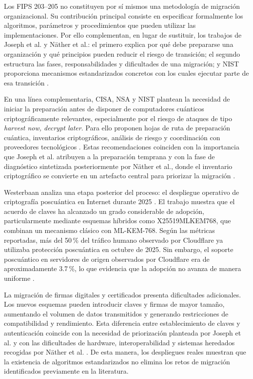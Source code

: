 Los FIPS 203--205 no constituyen por sí mismos una metodología de migración organizacional. Su contribución principal consiste en especificar formalmente los algoritmos, parámetros y procedimientos que pueden utilizar las implementaciones. Por ello complementan, en lugar de sustituir, los trabajos de Joseph et al. y Näther et al.: el primero explica por qué debe prepararse una organización y qué principios pueden reducir el riesgo de transición; el segundo estructura las fases, responsabilidades y dificultades de una migración; y NIST proporciona mecanismos estandarizados concretos con los cuales ejecutar parte de esa transición \cite{joseph2022transitioning,naether2024migrating,nist2024fips203,nist2024fips204,nist2024fips205}.

En una línea complementaria, CISA, NSA y NIST plantean la necesidad de iniciar la preparación antes de disponer de computadores cuánticos criptográficamente relevantes, especialmente por el riesgo de ataques de tipo \textit{harvest now, decrypt later}. Para ello proponen hojas de ruta de preparación cuántica, inventarios criptográficos, análisis de riesgo y coordinación con proveedores tecnológicos \cite{cisa2023quantum}. Estas recomendaciones coinciden con la importancia que Joseph et al. atribuyen a la preparación temprana y con la fase de diagnóstico sintetizada posteriormente por Näther et al., donde el inventario criptográfico se convierte en un artefacto central para priorizar la migración \cite{joseph2022transitioning,naether2024migrating,cisa2023quantum}.

Westerbaan analiza una etapa posterior del proceso: el despliegue operativo de criptografía poscuántica en Internet durante 2025 \cite{westerbaan2025postquantum}. El trabajo muestra que el acuerdo de claves ha alcanzado un grado considerable de adopción, particularmente mediante esquemas híbridos como X25519MLKEM768, que combinan un mecanismo clásico con ML-KEM-768. Según las métricas reportadas, más del 50\,\% del tráfico humano observado por Cloudflare ya utilizaba protección poscuántica en octubre de 2025. Sin embargo, el soporte poscuántico en servidores de origen observados por Cloudflare era de aproximadamente 3.7\,\%, lo que evidencia que la adopción no avanza de manera uniforme \cite{westerbaan2025postquantum}.

La migración de firmas digitales y certificados presenta dificultades adicionales. Los nuevos esquemas pueden introducir claves y firmas de mayor tamaño, aumentando el volumen de datos transmitidos y generando restricciones de compatibilidad y rendimiento. Esta diferencia entre establecimiento de claves y autenticación coincide con la necesidad de priorización planteada por Joseph et al. y con las dificultades de hardware, interoperabilidad y sistemas heredados recogidas por Näther et al. \cite{joseph2022transitioning,naether2024migrating,westerbaan2025postquantum}. De esta manera, los despliegues reales muestran que la existencia de algoritmos estandarizados no elimina los retos de migración identificados previamente en la literatura.

